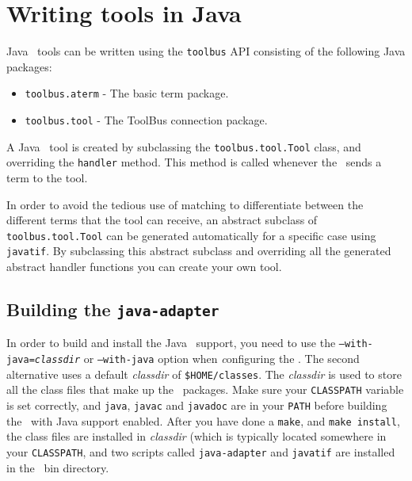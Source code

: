 
\section{\label{ToolsInJava}Writing tools in Java}

Java \TB\ tools can be written using the {\tt toolbus} API
consisting of the following Java packages:

\begin{itemize}
\item {\tt toolbus.aterm} - The basic term package.
\item {\tt toolbus.tool} - The ToolBus connection package.
\end{itemize}

A Java \TB\ tool is created by subclassing the {\tt toolbus.tool.Tool}
class, and overriding the {\tt handler} method. This method is called
whenever the \TB\ sends a term to the tool.

In order to avoid the tedious use of matching to differentiate between
the different terms that the tool can receive, an abstract subclass of 
{\tt toolbus.tool.Tool} can be generated automatically for a specific
case using {\tt javatif}. By subclassing this abstract subclass and
overriding all the generated abstract handler functions you can create
your own tool.

\subsection{Building the {\tt java-adapter}}
In order to build and install the Java \TB\ support, you need to
use the {\tt --with-java=\emph{classdir}} or {\tt --with-java} option
when {\emph configuring} the \TB. The second alternative uses a
default \emph{classdir} of {\tt \$HOME/classes}. The \emph{classdir}
is used to store all the class files that make up the \TB\ packages.
Make sure your {\tt CLASSPATH} variable is set correctly, and {\tt java},
{\tt javac} and {\tt javadoc} are in your {\tt PATH} before building the
\TB\ with Java support enabled. After you have done a {\tt make}, and 
{\tt make install}, the class files are installed in \emph{classdir} (which
is typically located somewhere in your {\tt CLASSPATH}, and two scripts called 
{\tt java-adapter} and {\tt javatif} are installed in the \TB\ bin directory.

